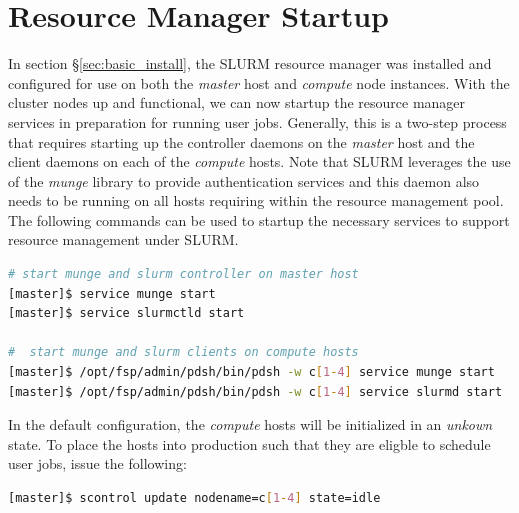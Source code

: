 \documentclass[letterpaper]{article}
\begin{document}
\section{Resource Manager Startup}

In section \S\ref{sec:basic_install}, the SLURM resource manager was installed
and configured for use on both the {\em master} host and {\em compute} node
instances. With the cluster nodes up and functional, we can now startup the
resource manager services in preparation for running user jobs. Generally, this
is a two-step process that requires starting up the controller daemons on the {\em
  master} host and the client daemons on each of the {\em compute} hosts.  
Note that SLURM leverages the use of the {\em munge} library to provide
authentication services and this daemon also needs to be running on all hosts
requiring within the resource management pool. 
The following commands can be used to startup the necessary services to support
resource management under SLURM.

\begin{lstlisting}[language=bash]
# start munge and slurm controller on master host
[master]$ service munge start
[master]$ service slurmctld start

#  start munge and slurm clients on compute hosts
[master]$ /opt/fsp/admin/pdsh/bin/pdsh -w c[1-4] service munge start
[master]$ /opt/fsp/admin/pdsh/bin/pdsh -w c[1-4] service slurmd start
\end{lstlisting}

In the default configuration, the {\em compute} hosts will be initialized in an
{\em unkown} state. To place the hosts into production such that they are
eligble to schedule user jobs, issue the following:


\begin{lstlisting}[language=bash]
[master]$ scontrol update nodename=c[1-4] state=idle
\end{lstlisting}
\end{document}
